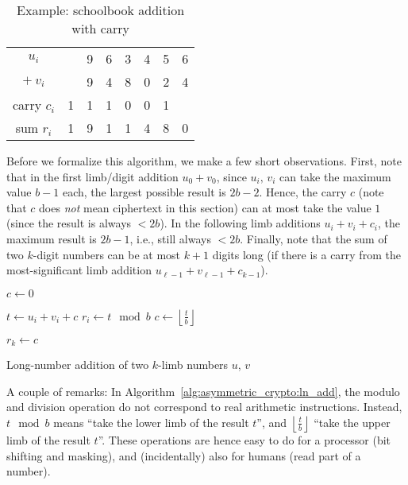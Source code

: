 \begin{table}[htbp]
	\centering
		\begin{tabular}{c | c c c c c c c}
			$u_i$       & & 9 & 6 & 3 & 4 & 5 & 6 \\
			$ +\ v_i$  & & 9 & 4 & 8 & 0 & 2 & 4 \\\hline
			carry $c_i$     & \footnotesize{1} & \footnotesize{1}  & \footnotesize{1} &  \footnotesize{0}  & \footnotesize{0}   & \footnotesize{1}  &   \\
			sum  $r_i$    & 1 & 9 &  1 &  1  & 4 & 8  & 0       
		\end{tabular}
	\caption{Example: schoolbook addition with carry}
	\label{tab:asymmetric_crypto:addb10}
\end{table}

Before we formalize this algorithm, we make a few short observations. First, note that in the first limb/digit addition $u_0 + v_0$, since $u_i,\,v_i$ can take the maximum value $b - 1$ each, the largest possible result is $2b-2$. Hence, the carry $c$ (note that $c$ does \emph{not} mean ciphertext in this section) can at most take the value $1$ (since the result is always $< 2b$). In the following limb additions $u_i + v_i + c_i$, the maximum result is $2b-1$, i.e., still always $< 2b$. Finally, note that the sum of two $k$-digit numbers can be at most $k+1$ digits long (if there is a carry from the most-significant limb addition $u_{\ell-1} + v_{\ell-1} + c_{k-1}$).

\begin{algorithm}
\center
\begin{algorithmic}
\vspace{2mm}
\State $c \gets 0$ 

	\State $t \gets u_i + v_i + c$
	\State $r_i \gets t \mod b$
	\State $c \gets \left\lfloor \frac{t}{b} \right\rfloor$
\EndFor

\State $r_{k} \gets c$

\vspace{2mm}
\end{algorithmic}
\caption{Long-number addition of two $k$-limb numbers $u$, $v$}
\label{alg:asymmetric_crypto:ln_add}
\end{algorithm}

A couple of remarks: In Algorithm~\ref{alg:asymmetric_crypto:ln_add}, the modulo and division operation do not correspond to real arithmetic instructions. Instead, $t \mod b$ means ``take the lower limb of the result $t$'', and $\left\lfloor \frac{t}{b} \right\rfloor$ ``take the upper limb of the result $t$''. These operations are hence easy to do for a processor (bit shifting and masking), and (incidentally) also for humans (read part of a number).

